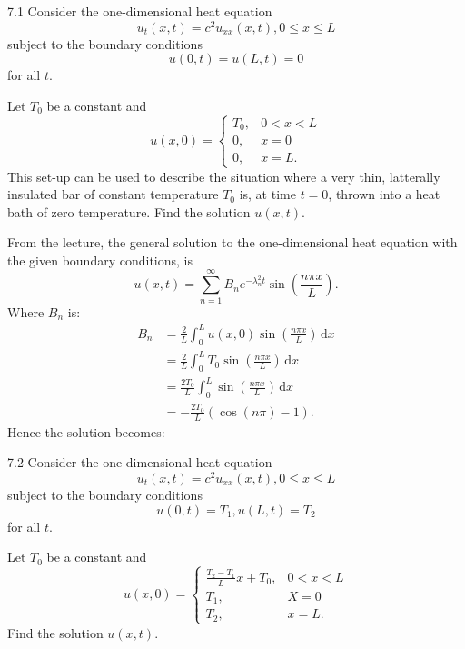 
\begin{problem}{7.1}
  Consider the one-dimensional heat equation
  \[ 
  u_t(x,t) = c^2 u_{x x}(x, t), 0 \leq x \leq L
  \]
  subject to the boundary conditions
  \[ 
  u(0,t) = u(L,t) = 0
  \]
  for all $t$.
  
  Let $T_0$ be a constant and
  \[ 
  u(x,0) = \begin{cases}
  T_0, & 0 < x < L\\
  0, & x = 0 \\
  0, & x = L
  .\end{cases}
  \]
  This set-up can be used to describe the situation where a very thin, latterally insulated bar of constant temperature $T_0$ is, at time $t = 0$, thrown into a heat bath of zero temperature.
  Find the solution $u(x,t)$.
\end{problem}

\begin{derivation}
  From the lecture, the general solution to the one-dimensional heat equation with the given boundary conditions, is
  \[ 
  u(x,t) = \sum_{n = 1}^{\infty} B_n e^{- \lambda^2_n t} \sin \left( \frac{n \pi x}{L} \right)
  .\]
  Where $B_n$ is:
  \begin{align*}
    B_n &= \frac{2}{L} \int_{0}^{L} u(x,0) \sin \left( \frac{n \pi x}{L} \right) \, \mathrm{d}x \\
        &= \frac{2}{L} \int_{0}^{L} T_0 \sin \left( \frac{n \pi x}{L} \right) \, \mathrm{d}x \\
        &= \frac{2 T_0}{L} \int_{0}^{L} \sin \left( \frac{n \pi x}{L} \right) \, \mathrm{d}x \\
        &= - \frac{2 T_0}{L} \left( \cos \left( n \pi \right) - 1 \right)
  .\end{align*}
  Hence the solution becomes:
\end{derivation}


\begin{problem}{7.2}
  Consider the one-dimensional heat equation
  \[ 
  u_t(x,t) = c^2 u_{x x} (x,t), 0 \leq x \leq L
  \]
  subject to the boundary conditions
  \[ 
  u(0,t) = T_1, u(L,t) = T_2
  \]
  for all $t$.

  Let $T_0$ be a constant and
  \[ 
  u(x,0) = \begin{cases}
  \frac{T_2 - T_1}{L}x + T_0, & 0 < x < L\\
  T_1, & X = 0 \\
  T_2, & x = L
  .\end{cases}
  \]
  Find the solution $u(x,t)$.
\end{problem}


